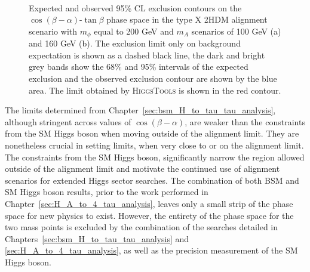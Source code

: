 \begin{figure}[!hbtp]
\centering
     \\
\caption[Plots of the model-dependent limits in the type X 2HDM, out of the alignment scenario, with overlayed \textsc{HiggsTools} limits.]{Expected and observed 95\% CL exclusion contours on the $\cos(\beta-\alpha)$-$\tan\beta$ phase space in the type X 2HDM alignment scenario with $m_{\phi}$ equal to 200 GeV and $m_{A}$ scenarios of 100 GeV (a) and 160 GeV (b). The exclusion limit only on background expectation is shown as a dashed black line, the dark and bright grey bands show the 68\% and 95\% intervals of the expected exclusion and the observed exclusion contour are shown by the blue area. The limit obtained by \textsc{HiggsTools} is shown in the red contour.}
\label{fig:4tau_cosbma_hb}
\end{figure}

The limits determined from Chapter~\ref{sec:bsm_H_to_tau_tau_analysis}, although stringent across values of $\cos(\beta-\alpha)$, are weaker than the constraints from the \ac{SM} Higgs boson when moving outside of the alignment limit.
They are nonetheless crucial in setting limits, when very close to or on the alignment limit.
The constraints from the \ac{SM} Higgs boson, significantly narrow the region allowed outside of the alignment limit and motivate the continued use of alignment scenarios for extended Higgs sector searches.
The combination of both \ac{BSM} and \ac{SM} Higgs boson results, prior to the work performed in Chapter~\ref{sec:H_A_to_4_tau_analysis}, leaves only a small strip of the phase space for new physics to exist.
However, the entirety of the phase space for the two mass points is excluded by the combination of the searches detailed in Chapters~\ref{sec:bsm_H_to_tau_tau_analysis} and \ref{sec:H_A_to_4_tau_analysis}, as well as the precision measurement of the \ac{SM} Higgs boson.

